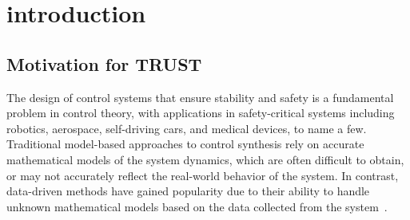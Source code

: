 \documentclass[sigconf]{acmart}
\begin{document}

\begin{CCSXML}

\end{CCSXML}





\maketitle


\section{introduction}\label{sec:introduction}

\subsection{Motivation for TRUST}\label{subsec:motivation-for-sintra-sb}

The design of control systems that ensure stability and safety is a fundamental problem in control theory, with applications in safety-critical systems including robotics, aerospace, self-driving cars, and medical devices, to name a few.
Traditional model-based approaches to control synthesis rely on accurate mathematical models of the system dynamics, which are often difficult to obtain, or may not accurately reflect the real-world behavior of the system.
In contrast, data-driven methods have gained popularity due to their ability to handle unknown mathematical models based on the data collected from the system~\cite{nejati2023data}.
\end{document}
